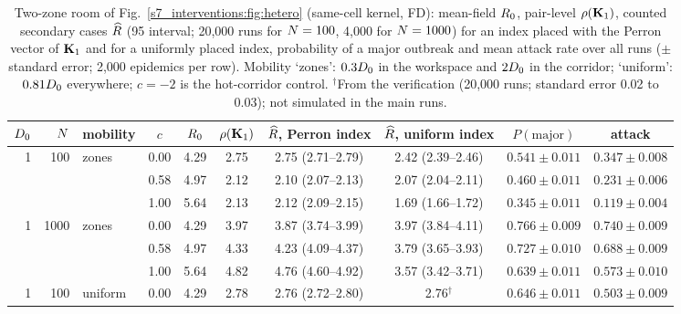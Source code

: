 \begin{table}[tbp]
  \centering\footnotesize\setlength{\tabcolsep}{3.5pt}
  \caption{Two-zone room of Fig.~\ref{s7_interventions:fig:hetero} (same-cell kernel, FD): mean-field $R_0$,
  pair-level $\rho(\mathbf{K}_1)$, counted secondary cases $\widehat{R}$ (95\pct{} interval; 20,000 runs for $N=100$,
  4,000 for $N=1000$) for an index placed with the Perron vector of $\mathbf{K}_1$ and for a uniformly placed
  index, probability of a major outbreak and mean attack rate over all runs ($\pm$ standard error; 2,000
  epidemics per row). Mobility `zones': $0.3D_0$ in the workspace and $2D_0$ in the corridor; `uniform':
  $0.81D_0$ everywhere; $c=-2$ is the hot-corridor control. $^{\dagger}$From the
  verification (20,000 runs; standard error 0.02 to 0.03); not simulated in the main runs.}
  \label{s7_interventions:tab:hetero}
  \begin{tabular}{@{}rrlccccccc@{}}
    \toprule
    $D_0$ & $N$ & mobility & $c$ & $R_0$ & $\rho(\mathbf{K}_1)$ & $\widehat{R}$, Perron index & $\widehat{R}$, uniform index & $P(\text{major})$ & attack \\
    \midrule
    1 & 100 & zones & 0.00 & 4.29 & 2.75 & 2.75 (2.71--2.79) & 2.42 (2.39--2.46) & $0.541\pm0.011$ & $0.347\pm0.008$ \\
     &  &  & 0.58 & 4.97 & 2.12 & 2.10 (2.07--2.13) & 2.07 (2.04--2.11) & $0.460\pm0.011$ & $0.231\pm0.006$ \\
     &  &  & 1.00 & 5.64 & 2.13 & 2.12 (2.09--2.15) & 1.69 (1.66--1.72) & $0.345\pm0.011$ & $0.119\pm0.004$ \\
    1 & 1000 & zones & 0.00 & 4.29 & 3.97 & 3.87 (3.74--3.99) & 3.97 (3.84--4.11) & $0.766\pm0.009$ & $0.740\pm0.009$ \\
     &  &  & 0.58 & 4.97 & 4.33 & 4.23 (4.09--4.37) & 3.79 (3.65--3.93) & $0.727\pm0.010$ & $0.688\pm0.009$ \\
     &  &  & 1.00 & 5.64 & 4.82 & 4.76 (4.60--4.92) & 3.57 (3.42--3.71) & $0.639\pm0.011$ & $0.573\pm0.010$ \\
    1 & 100 & uniform & 0.00 & 4.29 & 2.78 & 2.76 (2.72--2.80) & 2.76$^{\dagger}$ & $0.646\pm0.011$ & $0.503\pm0.009$ \\

\end{tabular}
\end{table}
